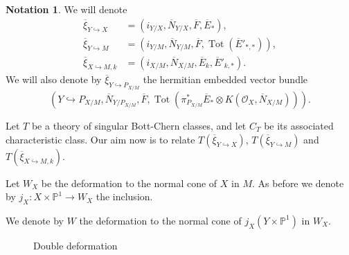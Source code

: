 \documentclass[10pt,twoside]{article}
\numberwithin{equation}{section}
\theoremstyle{plain}
\theoremstyle{definition}
\newtheorem{notation}[equation]{Notation}
\DeclareMathOperator{\Tot}{Tot}
\begin{document}
\begin{notation}\label{def:4}
We will denote
\begin{align*}
  \overline \xi_{Y\hookrightarrow X}&=(i_{Y/X},\overline
  N_{Y/X},\overline F,\overline E_{\ast}),\\ 
  \overline \xi_{Y\hookrightarrow M}&=(i_{Y/M},\overline
  N_{Y/M},\overline F,\Tot (\overline E'_{\ast,\ast})),\\ 
  \overline \xi_{X\hookrightarrow M,k}&=(i_{X/M},\overline
  N_{X/M},\overline E_{k},\overline E'_{k,\ast}). 
\end{align*}
We will also denote by
$\overline \xi_{Y\hookrightarrow P_{X/M}}$ the hermitian embedded
vector bundle
\begin{displaymath}
  \left(Y\hookrightarrow P_{X/M},\overline N_{Y/P_{X/M}},\overline
    F,\Tot(\pi _{P_{X/M}}^{\ast}\overline E_{\ast} \otimes 
    K(\mathcal{O}_{X},\overline N_{X/M}))\right).
\end{displaymath}  
\end{notation}


Let $T$ be a theory of singular Bott-Chern classes, and let $C_{T}$ be
its associated characteristic class. 
Our aim now is to relate $T(\overline \xi_{Y\hookrightarrow X})$,
$T(\overline \xi_{Y\hookrightarrow M})$ 
and $T(\overline \xi_{X\hookrightarrow M,k})$.

    
Let $W_{X}$ be the deformation to the normal cone of $X$ in $M$. As
before we
denote by $j_{X}\colon X\times \mathbb{P}^{1}\longrightarrow W_{X}$
the inclusion. 


We denote by $W$ the deformation to the normal cone of $j_{X}(Y\times
\mathbb{P}^{1})$ in $W_{X}$.
\begin{figure}[h]
  \centering
  \ifpdf
  
  \else
  
  \fi
  \caption{Double deformation}
  \label{fig:df}
\end{figure}
\end{document}

